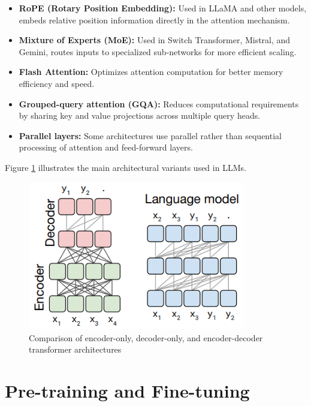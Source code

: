 \documentclass[11pt,a4paper]{report}
\begin{document}
\begin{itemize}
    \item \textbf{RoPE (Rotary Position Embedding):} Used in LLaMA and other models, embeds relative position information directly in the attention mechanism.
    
    \item \textbf{Mixture of Experts (MoE):} Used in Switch Transformer, Mistral, and Gemini, routes inputs to specialized sub-networks for more efficient scaling.
    
    \item \textbf{Flash Attention:} Optimizes attention computation for better memory efficiency and speed.
    
    \item \textbf{Grouped-query attention (GQA):} Reduces computational requirements by sharing key and value projections across multiple query heads.
    
    \item \textbf{Parallel layers:} Some architectures use parallel rather than sequential processing of attention and feed-forward layers.
\end{itemize}

Figure \ref{fig:transformer-variants} illustrates the main architectural variants used in LLMs.

\begin{figure}[ht]
    \centering
    \includegraphics[width=0.85\textwidth]{transformer_architecture_variants.png}
    \caption{Comparison of encoder-only, decoder-only, and encoder-decoder transformer architectures}
    \label{fig:transformer-variants}
\end{figure}

\section{Pre-training and Fine-tuning}
\end{document}
